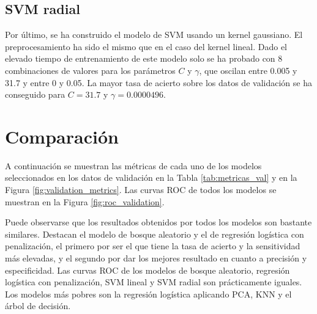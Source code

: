 \documentclass[12pt,a4paper,]{book}
\numberwithin{dummy}{section}
\theoremstyle{ocrenumbox}
\theoremstyle{blacknumex}
\theoremstyle{blacknumbox}
\theoremstyle{ocrenum}
\theoremstyle{ocrenum}
\begin{document}
\hypertarget{svm-radial}{%
\subsection{SVM radial}\label{svm-radial}}

Por último, se ha construido el modelo de SVM usando un kernel
gaussiano. El preprocesamiento ha sido el mismo que en el caso del
kernel lineal. Dado el elevado tiempo de entrenamiento de este modelo
solo se ha probado con 8 combinaciones de valores para los parámetros
\(C\) y \(\gamma\), que oscilan entre 0.005 y 31.7 y entre 0 y 0.05. La
mayor tasa de acierto sobre los datos de validación se ha conseguido
para \(C = 31.7\) y \(\gamma = 0.0000496\).

\hypertarget{comparaciuxf3n}{%
\section{Comparación}\label{comparaciuxf3n}}

A continuación se muestran las métricas de cada uno de los modelos
seleccionados en los datos de validación en la Tabla
\ref{tab:metricas_val} y en la Figura \ref{fig:validation_metrics}. Las
curvas ROC de todos los modelos se muestran en la Figura
\ref{fig:roc_validation}.

Puede observarse que los resultados obtenidos por todos los modelos son
bastante similares. Destacan el modelo de bosque aleatorio y el de
regresión logística con penalización, el primero por ser el que tiene la
tasa de acierto y la sensitividad más elevadas, y el segundo por dar los
mejores resultado en cuanto a precisión y especificidad. Las curvas ROC
de los modelos de bosque aleatorio, regresión logística con
penalización, SVM lineal y SVM radial son prácticamente iguales. Los
modelos más pobres son la regresión logística aplicando PCA, KNN y el
árbol de decisión.

\begin{table}[]
\centering
{}
\caption{Métricas de los modelos seleccionados sobre el conjunto de validación.  \it Fuente: Elaboración propia.}
\label{tab:metricas_val}
\end{table}
\end{document}
